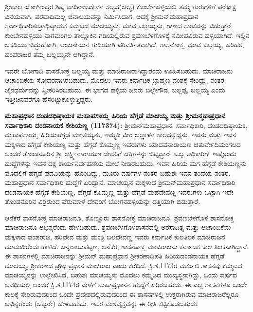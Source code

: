 ಶ‍್ರೀಪಾಲ ಯೋಗೀಂದ್ರರ ಶಿಷ್ಯ ವಾದಿರಾಜದೇವನ ಸಲ್ಯದ(ಚಲ್ಯ) ಕುಂಬೇನಹಳ್ಳಿಯಲ್ಲಿ ತಮ್ಮ ಗುರುಗಳಿಗೆ ಪರೋಕ್ಷ ವಿನಯವಾಗಿ, ಪರವಾದಿಮಲ್ಲ ಜಿನಾಲಯವನ್ನು ನಿರ್ಮಿಸಿದಾಗ, ಅದಕ್ಕೆ ಶ‍್ರೀಮನ್​ಮಹಾಪ್ರಧಾನ ಸರ್ವಾಧಿಕಾರಿ\break ತಂತ್ರಾಧಿಷ್ಠಾಯಕ ಕಮ್ಮಟದ ಮಾಚಯ್ಯನು, ಮಾವ ಬಲ್ಲಯ್ಯನು, ಗಾಣದ ಸುಂಕವನ್ನು ಬಿಡುತ್ತಾರೆ. ಕುಂಬೇನಹಳ್ಳಿಯು ನಾಗಮಂಗಲ ತಾಲ್ಲೂಕಿನ ಗಡಿಯಲ್ಲಿರುವ ಶ್ರವಣಬೆಳಗೊಳಕ್ಕೆ ಸಮೀಪವಿರುವ ಹಳ್ಳಿಯಾಗಿದೆ. ಇಲ್ಲಿನ ಬಸದಿಯು ಬಿದ್ದುಹೋಗಿ, ಆಂಜನೇಯನ ಗುಡಿಯಾಗಿ ಪರಿವರ್ತಿತವಾಗಿದೆ. ಶಾಸನೋಕ್ತ, ಮಾವ ಬಲ್ಲಯ್ಯ, ಹರಿಹರ, ಹಂಪರಾಜರ ತಮ್ಮ ಬಲ್ಲಯ್ಯನೇ ಆಗಿದ್ದಾನೆ.

ಇವರೇ ಬೋಗಾದಿ ಶಾಸನೋಕ್ತ ಬಲ್ಲಯ್ಯ ಮತ್ತು ಮಾಚಿರಾಜರಾಗಿದ್ದಾರೆಂದು ಊಹಿಸಬಹುದು. ಮಾಚಿರಾಜನು ಆಚಾಂಬಿಕೆಯ ಸೋದರನಾಗಿರಬಹುದು. ಮೊದಲು ಇವರು ಕರ್ನಾಟಕ ಬ್ರಾಹ್ಮಣ ವಂಶಕ್ಕೆ ಸೇರಿದ್ದು, ನಂತರ ಜೈನಧರ್ಮವನ್ನು ಸ್ವೀಕರಿಸಿರಬಹುದು. ಈ ಭಾಗದ ಹಳ್ಳಿಯ ಜನರು ಬಲ್ಲೇಗೌಡ, ಬಲ್ಲಪ್ಪ, ಬಲ್ಲಯ್ಯ ಎಂದು ಇತ್ತೀಚಿನವರೆಗೂ ಹೆಸರಿಟ್ಟು\-ಕೊಳ್ಳುತ್ತಿದ್ದರು.

\textbf{ಮಹಾಪ್ರಧಾನ ದಂಡದಧಿಷ್ಠಾಯಕ ಮಹಾಪಸಾಯ್ತ ಹಿರಿಯ ಹೆಗ್ಗಡೆ ಮಾಚಯ್ಯ ಮತ್ತು ಶ‍್ರೀಮನ್ಮಹಾಪ್ರಧಾನ ಸರ್ವಾಧಿಕಾರಿ ದಂಡನಾಯಕ ಕೇಶಿಯಣ್ಣ (1173\general{\enginline{-}}74):} ಶ‍್ರೀಮನ್​ಮಹಾಪ್ರಧಾನ, ಸರ್ವಾಧಿಕಾರಿ, ದಂಡದಧಿಷ್ಠಾಯಕ, ಮಹಾಪಸಾಯ್ತ, ಹಿರಿಯಹೆಗ್ಗಡೆ ಮಾಚಯ್ಯನು, ಇಮ್ಮಡಿ ವೀರ ಬಲ್ಲಾಳನ ಕಾಲದಲ್ಲಿದ್ದನು. ಇವನು ಮತ್ತು ಇವನ ಮಕ್ಕಳಾದ ಹೆಗ್ಗಡೆ ಕೇಶಿಯಣ್ಣ ಮತ್ತು ಹೆಗ್ಗಡೆ ಕೊಮ್ಮಣ್ಣ ಇವರುಗಳು ಯಾದವನಾರಾಯಣ ಚತುರ್ವೇದಿಮಂಗಲದ ಅಂದರೆ ತೊಂಡನೂರಿನ ಶ‍್ರೀ ಲಕ್ಷ್ಮೀನಾರಾಯಣ ದೇವರಿಗೆ ದತ್ತಿಗಳನ್ನು ಬಿಟ್ಟಿದ್ದಾರೆ. ಒಬ್ಬ ಅಧಿಕಾರಿಗೇ ಇಷ್ಟೊಂದು ಹುದ್ದೆಗಳನ್ನು ಇವನ ದಕ್ಷ ಕಾರ್ಯನಿರ್ವಹಣೆಯ ಮೇಲೆ ನೀಡಿರಬಹುದು. ಇವನ ಹಿರಿಯ ಮಗ ಹೆಗ್ಗಡೆ ಕೇಶಿಯಣ್ಣನು ಮೊದಲಿಗೆ ಹೆಗ್ಗಡೆ ಪದವಿಯನ್ನು ಹೊಂದಿದ್ದು, ಮೂರು ವರ್ಷಗಳ ನಂತರ ಬಹುಶಃ ಇವನ ತಂದೆಯ ನಂತರ, ಮಹಾಪ್ರಧಾನ ಸರ್ವಾಧಿಕಾರಿ ಹುದ್ದೆಗೆ ಏರಿದ್ದಾನೆ. ಮಾಚಯ್ಯನ ಮಕ್ಕಳಾದ ಶ‍್ರೀಮನ್​ ಮಹಾಪ್ರಧಾನ ಸರ್ವಾಧಿಕಾರಿ ದಂಡನಾಯಕ ಹೆಗ್ಗಡೆ ಕೇಶಿಯಣ್ಣ, ಹೆಗ್ಗಡೆ ಕೊಮ್ಮಣ್ಣ ಮತ್ತು ಹೆಗ್ಗಡೆ ಮಹದೇವಣ್ಣ ಇವರುಗಳು ಒಟ್ಟಾಗಿ ಇದೇ ತೊಂಡನೂರಿನ ವಿರ್ರಿರುಂದ ಪೆರುಮಾಳೆ ದೇವರಿಗೆ ಬೋಗನಹಳ್ಳಿಯನ್ನು ದತ್ತಿಯಾಗಿ ಬಿಡುತ್ತಾರೆ.

ಆನೆಕೆರೆ ಶಾಸನೋಕ್ತ ಮಾಚಿರಾಜನೂ, ತೊಣ್ಣೂರು ಶಾಸನೋಕ್ತ ಮಾಚಿರಾಜನೂ, ಶ್ರವಣಬೆಳಗೊಳ ಶಾಸನೋಕ್ತ ಮಾಚಿರಾಜನೂ ಅಭಿನ್ನರೆಂದು ಹೇಳಬಹುದು. ಶ್ರವಣಬೆಳಗೊಳಶಾಸನದಲ್ಲಿ ಅರಸಾದಿತ್ಯ ಮತ್ತು ಆಚಾಂಬಿಕೆಯ ಮಕ್ಕಳಾದ ಪಂಪರಾಜ, ಹರಿದೇವ ಮತ್ತು ಮಂತ್ರಿ ಬಲದೇವಣ್ಣ ಇವರು ಕರ್ನಾಟಕ ಕುಲತಿಲಕ ಮಾಚಿರಾಜನ ಮಾವಂದಿರೆಂದು ಹೇಳಿದೆ. ಚನ್ನರಾಯಪಟ್ಟಣ, ಆನೆಕೆರ, ಶಾಸನೋಕ್ತ ಮಾಚಿರಾಜನು ಕರ್ನಾಟಕ ಕುಲ ತಿಲಕನಾಗಿದ್ದಾನೆ. ಈ ಶಾಸನಗಳಲ್ಲಿ ಮಾಚಿರಾಜನನ್ನು ಶ‍್ರೀಮನ್​ ಮಹಾಪ್ರಧಾನ ಶ‍್ರೀಕರಣಾಧಿಪತಿ ಹಿರಿಯದಂಡನಾಯಕ ಹೆಗ್ಗಡೆ ಮಾಚಯ್ಯ, ಶ‍್ರೀಕರಣದ ಪ್ರೌಢ ಪ್ರಧಾನ ಮಾಚಿರಾಜ ಎಂದು ಕರೆದಿದೆ. ಕ್ರಿ.ಶ.1173ರ ಮರ್ಕುಲಿ ಶಾಸನವು ಕಮ್ಮಟದ ಮಾಚಯ್ಯನನ್ನು ಉಲ್ಲೇಖಿಸಿದೆ. ಬಹುಶಃ ಮಾಚಯ್ಯನು ಮೊದಲು ಕಮ್ಮಟದ ಮುಖ್ಯಸ್ಥನಾಗಿದ್ದು, ಒಂದು ವರ್ಷದ ಅವಧಿಯಲ್ಲಿ ಅಂದರೆ ಕ್ರಿ.ಶ.1174ರ ವೇಳೆಗೆ ಮಹಾಪ್ರಧಾನನ ಹುದ್ದೆಗೆ ಏರಿರಬಹುದು. ಈ ಎಲ್ಲ ಶಾಸನಗಳೂ ಒಂದೇ ಕಾಲಕ್ಕೆ ಸೇರಿರುವುದರಿಂದ ಒಂದೇ ಪ್ರದೇಶದಲ್ಲಿರುವುದರಿಂದ ಈ ಶಾಸನಗಳಲ್ಲಿ ಉಕ್ತರಾಗಿರುವ ಮಾಚಿರಾಜರೆಲ್ಲರೂ ಅಭಿನ್ನರೆಂದು (ಒಬ್ಬರೇ) ಹೇಳಬಹುದು. ಇವರ ವಂಶವೃಕ್ಷವನ್ನು ಈ ರೀತಿ ಕಟ್ಟಿಕೊಡಬಹುದು.

